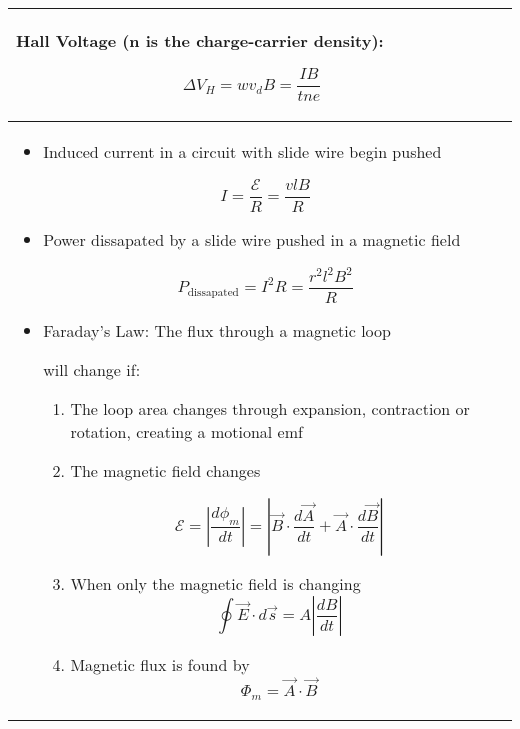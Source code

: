 \documentclass{article}
\begin{document}
\begin{center}
\begin{longtable}{|p{9cm}|p{9cm}|}
\begin{itemize}
		\end{itemize}



		Hall Voltage (n is the charge-carrier density):

		\[ \Delta V_H = wv_dB = \frac{IB}{tne}\]                                                                  \\

		\hline



		\begin{itemize}

			\item Induced current in a circuit with slide wire begin pushed



			      \[ I = \frac{\mathcal{E}}{R} = \frac{vlB}{R} \]



			\item Power dissapated by a slide wire pushed in a magnetic field

			      \[ P_\text{dissapated} = I^2 R = \frac{r^2 l^2 B^2}{R} \]

			\item Faraday's Law: The flux through a magnetic loop

			      will change if:



			      \begin{enumerate}

				      \item The loop area changes through expansion, contraction or rotation, creating a motional emf

				      \item The magnetic field changes

				            \[\mathcal{E} = \left\lvert \frac{d\phi_m}{dt}\right\rvert = \left\lvert \vec{B} \cdot \frac{d\vec{A}}{dt} + \vec{A} \cdot \frac{d\vec{B}}{dt}\right\rvert\]

				      \item When only the magnetic field is changing\[ \oint \vec{E} \cdot d\vec{s} = A\left\lvert \frac{dB}{dt}\right\rvert\]

				      \item Magnetic flux is found by\[ \Phi_m = \vec{A}\cdot\vec{B}\]

			      \end{enumerate}

		\end{itemize}






\end{longtable}
\end{center}
\end{document}
